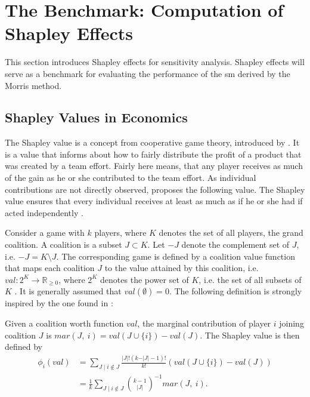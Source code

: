 \section{The Benchmark: Computation of Shapley Effects} \label{comp_shap}

This section introduces Shapley effects for sensitivity analysis. Shapley effects will serve as a benchmark for evaluating the performance of the sm derived by the Morris method.

\subsection{Shapley Values in Economics}

The Shapley value is a concept from cooperative game theory, introduced by \citet{S53}. It is a value that informs about how to fairly distribute the profit of a product that was created by a team effort. Fairly here means, that any player receives as much of the gain as he or she contributed to the team effort. As individual contributions are not directly observed, \citet{S53} proposes the following value. The Shapley value ensures that every individual receives at least as much as if he or she had if acted independently \citep{IP19}.

Consider a game with $k$ players, where $K$ denotes the set of all players, the grand coalition. A coalition is a subset $J \subset K$. Let $- J$ denote the complement set of $J$, i.e. $- J = K \setminus{J}$. The corresponding game is defined by a coalition value function that maps each coalition $J$ to the value attained by this coalition, i.e. $val: 2^K \to \mathbb{R}_{\geq 0}$, where $2^K$ denotes the power set of $K$, i.e. the set of all subsets of $K$ \citep{SNS16}. It is generally assumed that $val(\emptyset) = 0$. The following definition is strongly inspired by the one found in \citet{PRB20}:

\begin{definition}

Given a coalition worth function $val$, the marginal contribution of player $i$ joining coalition $J$ is $mar(J,\ i)=val(J \cup \{i\}) - val(J)$. The Shapley value is then defined by
\begin{equation}
\begin{split}
\phi_{i} (val)& = \sum_{J \mid i \notin J} \frac{\vert J \vert ! (k - \vert J \vert - 1) ! }{ k !} (val(J \cup \{i\}) - val(J)) \\
& = \frac{1}{k} \sum_{J \mid i \notin J} \binom{k-1}{\vert J \vert}^{-1} mar(J,\ i).
\end{split}
\end{equation}

\end{definition}

